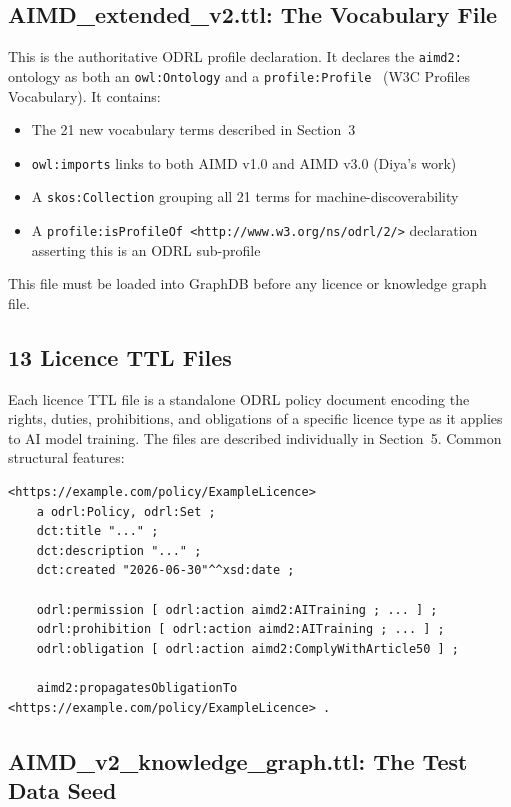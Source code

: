 \documentclass[12pt,a4paper]{article}
\begin{document}
\subsection{AIMD\_extended\_v2.ttl: The Vocabulary File}

This is the authoritative ODRL profile declaration. It declares the \texttt{aimd2:} ontology as both an \texttt{owl:Ontology} and a \texttt{profile:Profile}~\cite{profilesvocab} (W3C Profiles Vocabulary). It contains:

\begin{itemize}[noitemsep]
  \item The 21 new vocabulary terms described in Section~3
  \item \texttt{owl:imports} links to both AIMD v1.0 and AIMD v3.0 (Diya's work)
  \item A \texttt{skos:Collection} grouping all 21 terms for machine-discoverability
  \item A \texttt{profile:isProfileOf <http://www.w3.org/ns/odrl/2/>} declaration asserting this is an ODRL sub-profile
\end{itemize}

This file must be loaded into GraphDB before any licence or knowledge graph file.

\subsection{13 Licence TTL Files}

Each licence TTL file is a standalone ODRL policy document encoding the rights, duties, prohibitions, and obligations of a specific licence type as it applies to AI model training. The files are described individually in Section~5. Common structural features:

\begin{lstlisting}
<https://example.com/policy/ExampleLicence>
    a odrl:Policy, odrl:Set ;
    dct:title "..." ;
    dct:description "..." ;
    dct:created "2026-06-30"^^xsd:date ;

    odrl:permission [ odrl:action aimd2:AITraining ; ... ] ;
    odrl:prohibition [ odrl:action aimd2:AITraining ; ... ] ;
    odrl:obligation [ odrl:action aimd2:ComplyWithArticle50 ] ;

    aimd2:propagatesObligationTo <https://example.com/policy/ExampleLicence> .
\end{lstlisting}

\subsection{AIMD\_v2\_knowledge\_graph.ttl: The Test Data Seed}
\end{document}

